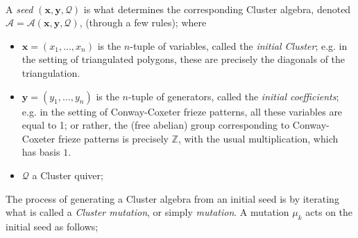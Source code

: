 \\
A \emph{seed} $(\mathbf{x},\mathbf{y},\mathcal{Q})$ is what determines the corresponding Cluster algebra, denoted $\mathcal{A} = \mathcal{A}(\mathbf{x},\mathbf{y},\mathcal{Q})$, (through a few rules); where
    \begin{itemize}
        \item $\mathbf{x}=(x_1,\dots,x_n)$ is the $n$-tuple of variables, called the \emph{initial Cluster}; e.g. in the setting of triangulated polygons, these are precisely the diagonals of the triangulation. 
        \item $\mathbf{y}=(y_1,\dots,y_n)$ is the $n$-tuple of generators, called the \emph{initial coefficients}; e.g. in the setting of Conway-Coxeter frieze patterns, all these variables are equal to 1; or rather, the (free abelian) group corresponding to Conway-Coxeter frieze patterns is precisely $\mathbb{Z}$, with the usual multiplication, which has basis $1$.
    	\item $\mathcal{Q}$ a Cluster quiver;
    \end{itemize}
The process of generating a Cluster algebra from an initial seed is by iterating what is called a \emph{Cluster mutation}, or simply \emph{mutation}. A mutation $\mu_k$ acts on the initial seed as follows; 

